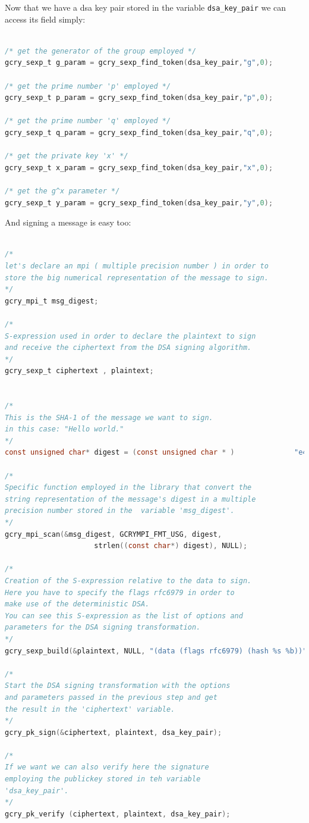 \documentclass[11pt,english]{article}
\begin{document}
Now that we have a dsa key pair stored in the variable \texttt{dsa\_key\_pair} we can access its field simply:

\begin{lstlisting}[language=c]

/* get the generator of the group employed */
gcry_sexp_t g_param = gcry_sexp_find_token(dsa_key_pair,"g",0);

/* get the prime number 'p' employed */
gcry_sexp_t p_param = gcry_sexp_find_token(dsa_key_pair,"p",0); 

/* get the prime number 'q' employed */
gcry_sexp_t q_param = gcry_sexp_find_token(dsa_key_pair,"q",0);

/* get the private key 'x' */
gcry_sexp_t x_param = gcry_sexp_find_token(dsa_key_pair,"x",0);

/* get the g^x parameter */
gcry_sexp_t y_param = gcry_sexp_find_token(dsa_key_pair,"y",0);

\end{lstlisting}

And signing a message is easy too:

\begin{lstlisting}[language=c]

/* 
let's declare an mpi ( multiple precision number ) in order to 
store the big numerical representation of the message to sign.
*/
gcry_mpi_t msg_digest;

/*
S-expression used in order to declare the plaintext to sign
and receive the ciphertext from the DSA signing algorithm.
*/
gcry_sexp_t ciphertext , plaintext;


/* 
This is the SHA-1 of the message we want to sign. 
in this case: "Hello world."
*/    
const unsigned char* digest = (const unsigned char * )         		"e44f3364019d18a151cab7072b5a40bb5b3e274f";
    
/*
Specific function employed in the library that convert the 
string representation of the message's digest in a multiple 
precision number stored in the  variable 'msg_digest'.
*/    
gcry_mpi_scan(&msg_digest, GCRYMPI_FMT_USG, digest, 
                     strlen((const char*) digest), NULL);

/*
Creation of the S-expression relative to the data to sign.
Here you have to specify the flags rfc6979 in order to 
make use of the deterministic DSA.
You can see this S-expression as the list of options and
parameters for the DSA signing transformation.
*/  
gcry_sexp_build(&plaintext, NULL, "(data (flags rfc6979) (hash %s %b))" , "sha1", 20 , msg_digest);

/*
Start the DSA signing transformation with the options
and parameters passed in the previous step and get
the result in the 'ciphertext' variable.
*/
gcry_pk_sign(&ciphertext, plaintext, dsa_key_pair);

/*
If we want we can also verify here the signature
employing the publickey stored in teh variable
'dsa_key_pair'.
*/
gcry_pk_verify (ciphertext, plaintext, dsa_key_pair);

\end{lstlisting}
\end{document}
